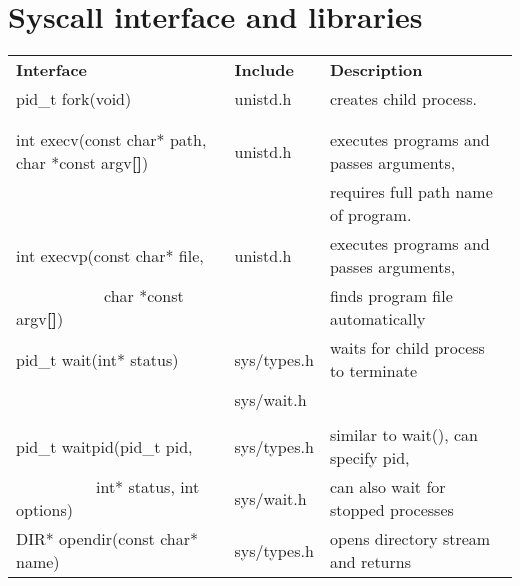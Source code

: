 \documentclass{article}
\begin{document}
\section{Syscall interface and libraries}
\begin{longtable}{p{1.5in} l p{4in}}
    \bf Interface & \bf Include & \bf Description
    \\
    pid\_t fork(void) & unistd.h & creates child process.
    \\
    & & %
    \\
    & & %
    \\ \hline
    int execv(const char* path, char *const argv\textbf{[]})& unistd.h & executes programs and 
        passes arguments, 
    \\
    & &requires full path name of program. 
    \\ \hline
    int execvp(const char* file, & unistd.h & executes programs and 
        passes arguments, 
    \\
    \ \ \ \ \ \ \ \ \ \ \ char *const argv\textbf{[]}) & &finds program file automatically
    \\ \hline
    pid\_t wait(int* status) & sys/types.h & waits for child process to terminate
    \\
    & sys/wait.h & %
    \\
    & & %
    \\ \hline
    pid\_t waitpid(pid\_t pid, & sys/types.h & similar to wait(), can specify pid,
    \\
    \ \ \ \ \ \ \ \ \ \ int* status, int options) & sys/wait.h & can also wait for stopped processes
    \\ \hline
    DIR* opendir(const char* name) & sys/types.h & opens directory stream and returns
    \\

\end{longtable}
\end{document}
